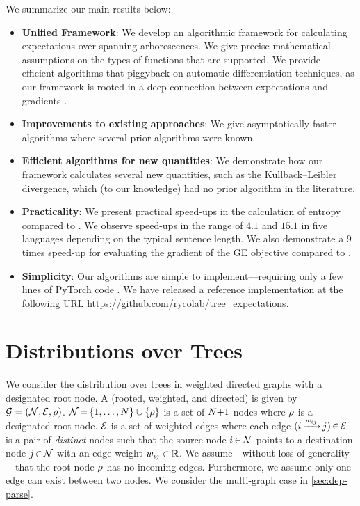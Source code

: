 \documentclass[11pt,a4paper]{article}
\newcommand{\ars}{arborescences\xspace}
\theoremstyle{definition}
\begin{document}
\noindent We summarize our main results below:
\begin{itemize}[leftmargin=1em, topsep=10pt, itemsep=1pt, parsep=1pt]

\item \textbf{Unified Framework}:
We develop an algorithmic framework for calculating expectations over spanning \ars{}.  We give precise mathematical assumptions on the types of functions that are supported.  We provide efficient algorithms that piggyback on automatic differentiation techniques, as our framework is rooted in a deep connection between expectations and gradients \citep{darwiche, li-eisner-2009}.

\item \textbf{Improvements to existing approaches}: 
We give asymptotically faster algorithms where several prior algorithms were known.

\item \textbf{Efficient algorithms for new quantities}: 
We demonstrate how our framework calculates several new quantities, such as the Kullback--Leibler divergence, which (to our knowledge) had no prior algorithm in the literature.

\item \textbf{Practicality}: We present practical speed-ups in the calculation of entropy compared to \citet{smith-eisner-2007}.
We observe speed-ups in the range of $4.1$ and $15.1$ in five languages depending on the typical sentence length.
We also demonstrate a $9$ times speed-up for evaluating the gradient of the GE objective compared to \citet{druck09covariance}.


\item \textbf{Simplicity}: Our algorithms are simple to implement---requiring only a few lines of PyTorch code \citep{pytorch}.
We have released a reference implementation at the following URL
\url{https://github.com/rycolab/tree_expectations}.
\end{itemize}

\section{Distributions over Trees}\label{sec:trees}
We consider the distribution over trees in weighted directed graphs with a designated root node.
A (rooted, weighted, and directed)  is given by $\mathcal{G}=({\mathcal{N}},{\mathcal{E}},{\rho})$.
${\mathcal{N}}\,{=}\,\{1,\dots,{N}\}\cup\{{\rho}\}$ is a set of ${N}{+}1$ nodes where ${\rho}$ is a designated root node.
${\mathcal{E}}$ is a set of weighted edges where
each edge $(i\,{\xrightarrow[]{{w_{ij}}}}\, j) \,{\in}\, {\mathcal{E}}$ 
is a pair of \emph{distinct} nodes such that 
the source node $i \,{\in}\, {\mathcal{N}}$ points to a 
destination node $j \,{\in}\, {\mathcal{N}}$ 
with an edge weight ${w_{ij}}\in\mathbb{R}$.
We assume---without loss of generality---that the root node ${\rho}$ has no incoming edges.
Furthermore, we assume only one edge can exist between two nodes.
We consider the multi-graph case
in \cref{sec:dep-parse}.
\end{document}
